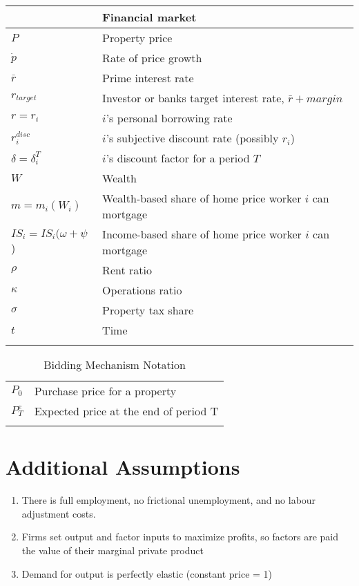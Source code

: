 \begin{longtable}{lp{10cm}}
\hline           & \textbf{Financial market}    \\ \hline
$P$              &  Property price              \\
$\dot p$         &  Rate of price growth        \\
$\bar r$         &  Prime interest rate         \\
$r_{target}$     &  Investor or banks target interest rate, $\bar r + margin$ \\
$r =  r_i$       &  $i$'s personal borrowing rate  \\
$r_i^{disc}$     &  $i$'s subjective discount rate (possibly $r_i$)           \\
$\delta = \delta_i^T$ &  $i$'s discount factor for a period $T$               \\
$W$  & Wealth \\
$m = m_i(W_i)$   &  Wealth-based share of home price worker $i$ can mortgage           \\
$IS_i = IS_i(\omega+\psi$)  &  Income-based share of home price worker $i$ can mortgage \\
$\rho$           &  Rent ratio             \\
$\kappa$         &  Operations ratio       \\
$\sigma$         &  Property tax share     \\ %
$t$              &  Time                   \\
\hline
\color{black}
\end{longtable}  


\newpage
\begin{longtable}{lp{10cm}}
\caption{Bidding Mechanism Notation}                       \\
\hline
$P_0$            &  Purchase price for a property          \\
$P^e_T$          &  Expected price at the end of period T  \\
\hline
\color{black}
\end{longtable}  

\section{Additional Assumptions}
\begin{enumerate}
\item There is full employment, no frictional unemployment, and no labour adjustment costs.
\item Firms set output and factor inputs to maximize profits, so factors are paid the value of their marginal private product
\item Demand for output is perfectly elastic (constant price = 1)
\end{enumerate}
